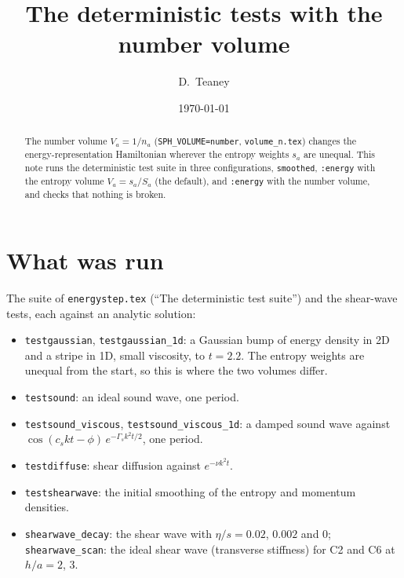 \documentclass[11pt,aps,preprint,nofootinbib,superscriptaddress,tightenlines]{revtex4-2}
\begin{document}
\title{The deterministic tests with the number volume}
\author{D.~Teaney}
\date{\today}

\begin{abstract}
The number volume $V_a=1/n_a$ (\texttt{SPH\_VOLUME=number}, \texttt{volume\_n.tex}) changes the
energy-representation Hamiltonian wherever the entropy weights $s_a$ are unequal.  This note
runs the deterministic test suite in three configurations, \texttt{smoothed},
\texttt{:energy} with the entropy volume $V_a=s_a/S_a$ (the default), and \texttt{:energy}
with the number volume, and checks that nothing is broken.
\end{abstract}

\maketitle

\section{What was run}
\label{sec:run}

The suite of \texttt{energystep.tex} (``The deterministic test suite'') and the shear-wave
tests, each against an analytic solution:
\begin{itemize}
\item \texttt{testgaussian}, \texttt{testgaussian\_1d}: a Gaussian bump of energy density
  in 2D and a stripe in 1D, small viscosity, to $t=2.2$.  The entropy weights are unequal from
  the start, so this is where the two volumes differ.
\item \texttt{testsound}: an ideal sound wave, one period.
\item \texttt{testsound\_viscous}, \texttt{testsound\_viscous\_1d}: a damped sound wave
  against $\cos(c_skt-\phi)\,e^{-\Gamma_sk^2t/2}$, one period.
\item \texttt{testdiffuse}: shear diffusion against $e^{-\nu k^2t}$.
\item \texttt{testshearwave}: the initial smoothing of the entropy and momentum densities.
\item \texttt{shearwave\_decay}: the shear wave with $\eta/s=0.02$, $0.002$ and $0$;
  \texttt{shearwave\_scan}: the ideal shear wave (transverse stiffness) for C2 and C6 at
  $h/a=2$, $3$.
\end{itemize}
\end{document}
